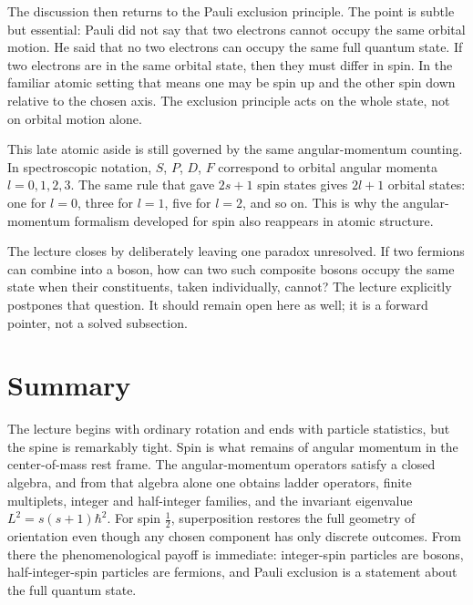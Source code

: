 The discussion then returns to the Pauli exclusion principle. The point is subtle but essential: Pauli did not say that two electrons cannot occupy the same orbital motion. He said that no two electrons can occupy the same full quantum state. If two electrons are in the same orbital state, then they must differ in spin. In the familiar atomic setting that means one may be spin up and the other spin down relative to the chosen axis. The exclusion principle acts on the whole state, not on orbital motion alone.

This late atomic aside is still governed by the same angular-momentum counting. In spectroscopic notation, \(S\), \(P\), \(D\), \(F\) correspond to orbital angular momenta \(l=0,1,2,3\). The same rule that gave \(2s+1\) spin states gives \(2l+1\) orbital states: one for \(l=0\), three for \(l=1\), five for \(l=2\), and so on. This is why the angular-momentum formalism developed for spin also reappears in atomic structure.

The lecture closes by deliberately leaving one paradox unresolved. If two fermions can combine into a boson, how can two such composite bosons occupy the same state when their constituents, taken individually, cannot? The lecture explicitly postpones that question. It should remain open here as well; it is a forward pointer, not a solved subsection.

\section{Summary}

The lecture begins with ordinary rotation and ends with particle statistics, but the spine is remarkably tight. Spin is what remains of angular momentum in the center-of-mass rest frame. The angular-momentum operators satisfy a closed algebra, and from that algebra alone one obtains ladder operators, finite multiplets, integer and half-integer families, and the invariant eigenvalue \(L^2=s(s+1)\hbar^2\). For spin \(\tfrac12\), superposition restores the full geometry of orientation even though any chosen component has only discrete outcomes. From there the phenomenological payoff is immediate: integer-spin particles are bosons, half-integer-spin particles are fermions, and Pauli exclusion is a statement about the full quantum state.